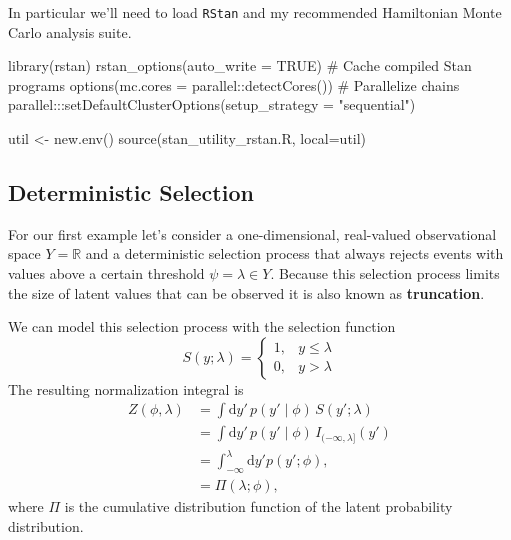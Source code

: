\documentclass[
  letterpaper,
  DIV=11,
  numbers=noendperiod]{scrartcl}
\newenvironment{Shaded}{\begin{snugshade}}{\end{snugshade}}
\newcommand{\AttributeTok}[1]{\textcolor[rgb]{0.40,0.45,0.13}{#1}}
\newcommand{\CommentTok}[1]{\textcolor[rgb]{0.37,0.37,0.37}{#1}}
\newcommand{\ConstantTok}[1]{\textcolor[rgb]{0.56,0.35,0.01}{#1}}
\newcommand{\FunctionTok}[1]{\textcolor[rgb]{0.28,0.35,0.67}{#1}}
\newcommand{\NormalTok}[1]{\textcolor[rgb]{0.00,0.23,0.31}{#1}}
\newcommand{\OtherTok}[1]{\textcolor[rgb]{0.00,0.23,0.31}{#1}}
\newcommand{\SpecialCharTok}[1]{\textcolor[rgb]{0.37,0.37,0.37}{#1}}
\newcommand{\StringTok}[1]{\textcolor[rgb]{0.13,0.47,0.30}{#1}}
\begin{document}
In particular we'll need to load \texttt{RStan} and my recommended
Hamiltonian Monte Carlo analysis suite.

\begin{Shaded}
\begin{Highlighting}[]
\FunctionTok{library}\NormalTok{(rstan)}
\FunctionTok{rstan\_options}\NormalTok{(}\AttributeTok{auto\_write =} \ConstantTok{TRUE}\NormalTok{)            }\CommentTok{\# Cache compiled Stan programs}
\FunctionTok{options}\NormalTok{(}\AttributeTok{mc.cores =}\NormalTok{ parallel}\SpecialCharTok{::}\FunctionTok{detectCores}\NormalTok{()) }\CommentTok{\# Parallelize chains}
\NormalTok{parallel}\SpecialCharTok{:::}\FunctionTok{setDefaultClusterOptions}\NormalTok{(}\AttributeTok{setup\_strategy =} \StringTok{"sequential"}\NormalTok{)}

\NormalTok{util }\OtherTok{\textless{}{-}} \FunctionTok{new.env}\NormalTok{()}
\FunctionTok{source}\NormalTok{(}\StringTok{\textquotesingle{}stan\_utility\_rstan.R\textquotesingle{}}\NormalTok{, }\AttributeTok{local=}\NormalTok{util)}
\end{Highlighting}
\end{Shaded}

\subsection{Deterministic Selection}\label{sec:demo_deterministic}

For our first example let's consider a one-dimensional, real-valued
observational space \(Y = \mathbb{R}\) and a deterministic selection
process that always rejects events with values above a certain threshold
\(\psi = \lambda \in Y\). Because this selection process limits the size
of latent values that can be observed it is also known as
\textbf{truncation}.

We can model this selection process with the selection function \[
S(y; \lambda)
=
\left\{
\begin{array}{rr}
1, & y \le \lambda \\
0, & y > \lambda
\end{array}
\right.
\] The resulting normalization integral is \begin{align*}
Z(\phi, \lambda)
&=
\int \mathrm{d}y' \, p(y' \mid \phi) \, S(y'; \lambda)
\\
&=
\int \mathrm{d}y' \, p(y' \mid \phi) \, I_{(-\infty, \lambda]}(y')
\\
&=
\int_{-\infty}^{\lambda} \mathrm{d}y' p(y'; \phi),
\\
&=
\Pi(\lambda; \phi),
\end{align*} where \(\Pi\) is the cumulative distribution function of
the latent probability distribution.
\end{document}
